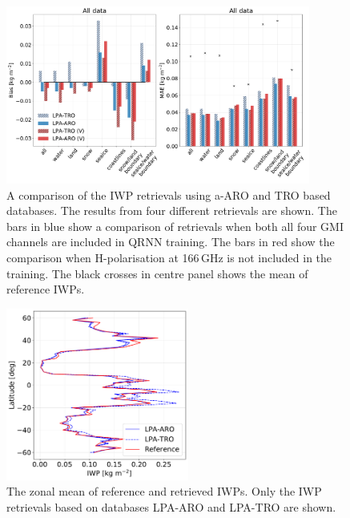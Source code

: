 \documentclass[amt, manuscript]{copernicus}
\begin{document}
\begin{figure}[t]
	\includegraphics[width=10cm]{Figures/ARO_TRO_v_vh_all.pdf}
	\caption{A comparison of the IWP retrievals using a-ARO and TRO based databases. The results from four different retrievals are shown. The bars in blue show a comparison of retrievals when both all four GMI channels are included in QRNN training. The bars in red show the comparison when H-polarisation at 166\,GHz is not included in the training. The black crosses in centre panel shows the mean of reference IWPs.  }
	\label{fig:bias_ARO_TRO}
\end{figure}

\begin{figure}[t]
	\includegraphics[width=6cm]{Figures/zonal_mean_all_jan_testdata.pdf}
	\caption{The zonal mean of reference and retrieved IWPs. Only the  IWP retrievals based on databases LPA-ARO and LPA-TRO are shown.}
	\label{fig:zonal_mean_test}
\end{figure}
\end{document}

